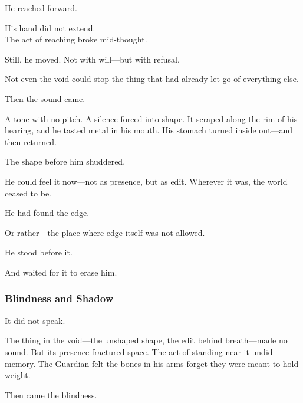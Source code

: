 \documentclass[12pt]{article}
\begin{document}
\vspace{0.5em}
He reached forward.

\vspace{0.5em}
His hand did not extend.\\
The act of reaching broke mid-thought.

\vspace{0.5em}
Still, he moved. Not with will---but with refusal.

\vspace{0.5em}
Not even the void could stop the thing that had already let go of everything else.

\vspace{0.5em}
Then the sound came.

\vspace{0.5em}
A tone with no pitch. A silence forced into shape. It scraped along the rim of his hearing, and he tasted metal in his mouth. His stomach turned inside out---and then returned.

\vspace{0.5em}
The shape before him shuddered.

\vspace{0.5em}
He could feel it now---not as presence, but as edit. Wherever it was, the world ceased to be.

\vspace{0.5em}
He had found the edge.

\vspace{0.5em}
Or rather---the place where edge itself was not allowed.

\vspace{0.5em}
He stood before it.

\vspace{0.5em}
And waited for it to erase him.

\dotfill

\subsubsection{Blindness and Shadow}

It did not speak.

\vspace{0.5em}
The thing in the void---the unshaped shape, the edit behind breath---made no sound. But its presence fractured space. The act of standing near it undid memory. The Guardian felt the bones in his arms forget they were meant to hold weight.

\vspace{0.5em}
Then came the blindness.
\end{document}
